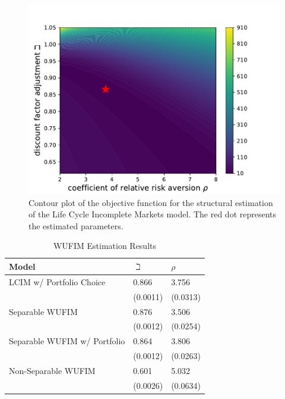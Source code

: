 \documentclass{article}
\newcommand{\CRRA}{\rho}
\begin{document}
\begin{figure}[!htbp]
\centering
\includegraphics[width=0.7\linewidth]{files/IndShockSMMcontour-f950f8faf8926e47605d36d01964a2f6.pdf}
\caption{Contour plot of the objective function for the structural estimation of the Life Cycle Incomplete Markets model. The red dot represents the estimated parameters.}
\label{fig:IndShockSMMcontour}
\end{figure}

\begin{table}
\centering
\caption{WUFIM Estimation Results}
\label{WUFIMestimation}
\begin{tabular}{p{}p{}p{}}
\toprule
Model & $\beth$ & $\CRRA$ \\
\hline
LCIM w/ Portfolio Choice & 0.866 & 3.756 \\
 & (0.0011) & (0.0313) \\
Separable WUFIM & 0.876 & 3.506 \\
 & (0.0012) & (0.0254) \\
Separable WUFIM w/ Portfolio & 0.864 & 3.806 \\
 & (0.0012) & (0.0263) \\
Non-Separable WUFIM & 0.601 & 5.032 \\
 & (0.0026) & (0.0634) \\
\bottomrule
\end{tabular}
\end{table}
\end{document}
